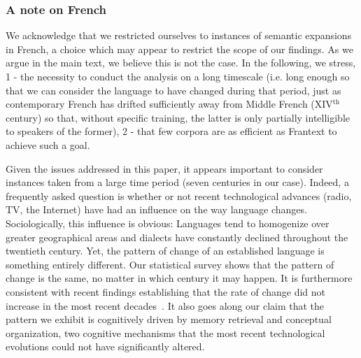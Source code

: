\documentclass[12pt,twocolumn,amsmath,amssymb,aps,longbibliography]{revtex4-1}  %
\begin{document}
\subsubsection*{A note on French}

We acknowledge that we restricted ourselves to instances of semantic expansions in French, a choice which may appear to restrict the scope of our findings. As we argue in the main text, we believe this is not the case. In the following, we stress, 1 - the necessity to conduct the analysis on a long timescale (i.e. long enough so that we can consider the language to have changed during that period, just as contemporary French has drifted sufficiently away from Middle French (XIV$^{\text{th}}$ century) so that, without specific training, the latter is only partially intelligible to speakers of the former), 2 - that few corpora are as efficient as Frantext to achieve such a goal. 

Given the issues addressed in this paper, it appears important to consider instances taken from a large time period (seven centuries in our case). Indeed, a frequently asked question is whether or not recent technological advances (radio, TV, the Internet) have had an influence on the way language changes. Sociologically, this influence is obvious: Languages tend to homogenize over greater geographical areas and dialects have constantly declined throughout the twentieth century. Yet, the pattern of change of an established language is something entirely different. Our statistical survey shows that the pattern of change is the same, no matter in which century it may happen. It is furthermore consistent with recent findings establishing that the rate of change did not increase in the most recent decades~\cite{dubossarsky2016verbs}. It also goes along our claim that the pattern we exhibit is cognitively driven by memory retrieval and conceptual organization, two cognitive mechanisms that the most recent technological evolutions could not have significantly altered. 
\end{document}
